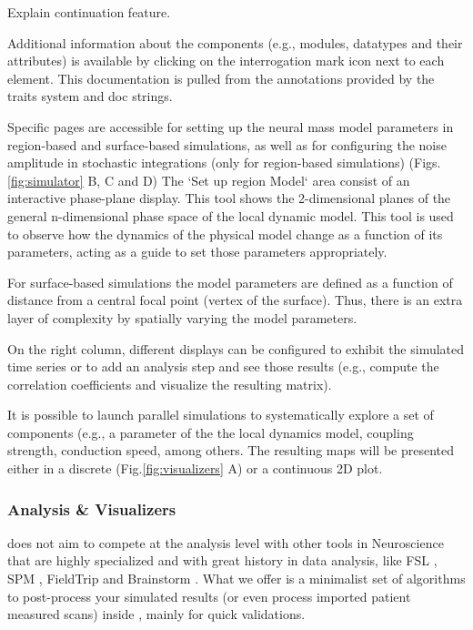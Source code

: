  \note[psl] Explain continuation feature.  

		Additional information about the components (e.g., modules, datatypes
		and their attributes) is available  by clicking on the interrogation
		mark icon next to each element. This documentation is pulled from the
		annotations provided by the traits system and doc strings.

		Specific pages are accessible for setting up the neural mass model
		parameters in region-based and surface-based simulations, as well as
		for configuring the noise amplitude in stochastic integrations (only
		for region-based simulations) (Figs. \ref{fig:simulator} B, C and D)
		The `Set up region Model` area consist of an interactive phase-plane
		display. This tool shows the 2-dimensional planes of the general
		n-dimensional phase space of the local dynamic model. This tool is
		used to observe how the dynamics of the physical model change as a
		function of its parameters, acting as a guide to set those parameters
		appropriately.

		For surface-based simulations the model parameters are defined as
		a function of distance from a central focal point (vertex of the
		surface). Thus, there is an extra layer of complexity by spatially
		varying the model parameters.

		On the right column, different displays can be configured to exhibit
		the simulated time series or to add an analysis step and see those
		results (e.g., compute the correlation coefficients and visualize the
		resulting matrix).

		It is possible to launch parallel simulations to systematically explore a set of
		components (e.g., a parameter of the  the local dynamics model, coupling
		strength, conduction speed, among others. The resulting maps will be presented
		either in a discrete (Fig.\ref{fig:visualizers} A) or a continuous 2D plot. 


		
		\subsubsection{Analysis \& Visualizers}

			\TVB does not aim to compete at the analysis level with other tools in
			Neuroscience that are highly specialized and with great history in data
			analysis, like FSL \cite{Smith_2004, Woolrich_2009, Jenkinson_2012} ,
			SPM \cite{Friston_1995}, FieldTrip \cite{Oostenveld_2011} and
			Brainstorm \cite{Tadel_2011}.  What we offer is a minimalist set of
			algorithms to post-process your simulated results (or even process
			imported patient measured scans) inside \TVB, mainly for quick
			validations.

